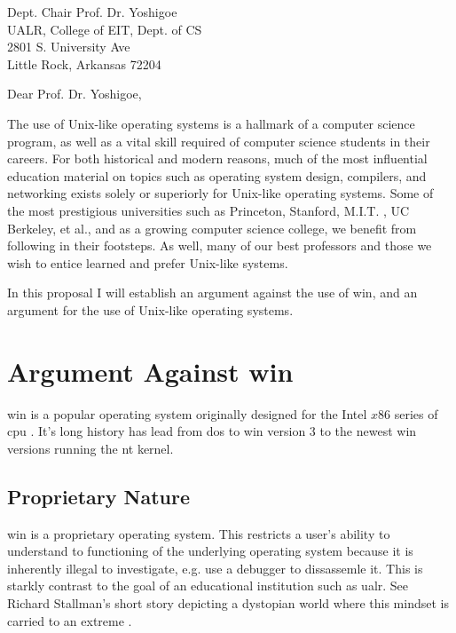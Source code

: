 \documentclass{letter}
\begin{document}
  \begin{letter}{
    Dept. Chair Prof. Dr. Yoshigoe \\
    UALR, College of EIT, Dept. of CS \\
    2801 S. University Ave \\
    Little Rock, Arkansas 72204
  }
    \opening{Dear Prof. Dr. Yoshigoe,}

    The use of Unix-like operating systems is a hallmark of a computer science program, as well as a vital skill required of computer science students in their careers. For both historical and modern reasons, much of the most influential education material on topics such as operating system design, compilers, and networking exists solely or superiorly for Unix-like operating systems. Some of the most prestigious universities such as Princeton, Stanford, M.I.T. \cite{MITLinux}, UC Berkeley, et al., and as a growing computer science college, we benefit from following in their footsteps. As well, many of our best professors and those we wish to entice learned and prefer Unix-like systems.

    In this proposal I will establish an argument against the use of \gls{win}, and an argument for the use of Unix-like operating systems.

    \section{Argument Against \gls{win}}

    \gls{win} is a popular operating system originally designed for the Intel $x$86 series of \gls{cpu} \cite{WindowsMarketShare}. It's long history has lead from \gls{dos} to \gls{win} version 3 to the newest \gls{win} versions running the \gls{nt} kernel.

    \subsection{Proprietary Nature}

    \gls{win} is a proprietary operating system. This restricts a user's ability to understand to functioning of the underlying operating system because it is inherently illegal to investigate, e.g. use a debugger to dissassemle it. This is starkly contrast to the goal of an educational institution such as \gls{ualr}. See Richard Stallman's short story depicting a dystopian world where this mindset is carried to an extreme \cite{RightToRead}.


\end{letter}
\end{document}

